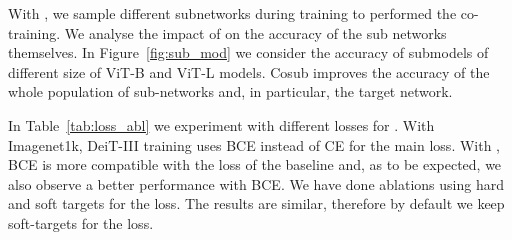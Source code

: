 With \ours, we sample different subnetworks during  training to  performed the co-training. 
We analyse the impact of \ours on the accuracy of the sub networks themselves. 
In Figure~\ref{fig:sub_mod} we consider the accuracy of submodels of different size of ViT-B and ViT-L models.
Cosub improves the accuracy of the whole population of sub-networks and, in particular, the target network. 


In Table~\ref{tab:loss_abl} we experiment with  different losses for \ours. 
With Imagenet1k, DeiT-III training uses BCE instead of CE for the main loss. 
With \ours, BCE is more compatible with the loss of the baseline and, as to be expected, we also observe a better performance with BCE.
We have done ablations using hard and soft targets for the \ours loss.
The results are similar, therefore by default we keep soft-targets for the \ours loss.


\begin{table}
    \centering
    \vspace{-0.7em}
    \caption{Training strategies with distillation. We compare on Imagenet-1k at resolution $224\times224$ different  approaches involving co- or self-training with distillation. 
    KD, mean teacher and co-training use the same $\lambda=0.5$ and same hyper-parameters as in Deit-III. Unlike \ours, the mean teacher (c) requires other hyper-parameters for EMA. We perform a small grid-search to adjust this parameters. 
    Note (last row): our approach is complementary with KD, assuming a pre-trained teacher is available beforehand. 
\label{tab:comp_different_app}}
\end{table}


